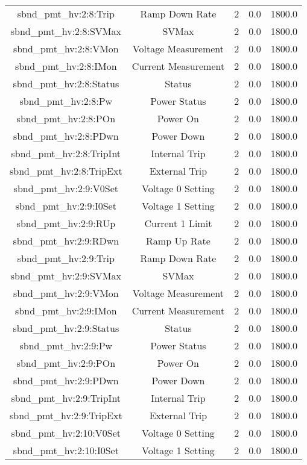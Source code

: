 \begin{center}
\begin{longtable}{c | c c c c }
sbnd\_pmt\_hv:2:8:Trip & Ramp Down Rate & 2 & 0.0 & 1800.0\\ 
sbnd\_pmt\_hv:2:8:SVMax & SVMax & 2 & 0.0 & 1800.0\\ 
sbnd\_pmt\_hv:2:8:VMon & Voltage Measurement & 2 & 0.0 & 1800.0\\ 
sbnd\_pmt\_hv:2:8:IMon & Current Measurement & 2 & 0.0 & 1800.0\\ 
sbnd\_pmt\_hv:2:8:Status & Status & 2 & 0.0 & 1800.0\\ 
sbnd\_pmt\_hv:2:8:Pw & Power Status & 2 & 0.0 & 1800.0\\ 
sbnd\_pmt\_hv:2:8:POn & Power On & 2 & 0.0 & 1800.0\\ 
sbnd\_pmt\_hv:2:8:PDwn & Power Down & 2 & 0.0 & 1800.0\\ 
sbnd\_pmt\_hv:2:8:TripInt & Internal Trip & 2 & 0.0 & 1800.0\\ 
sbnd\_pmt\_hv:2:8:TripExt & External Trip & 2 & 0.0 & 1800.0\\ 
sbnd\_pmt\_hv:2:9:V0Set & Voltage 0 Setting & 2 & 0.0 & 1800.0\\ 
sbnd\_pmt\_hv:2:9:I0Set & Voltage 1 Setting & 2 & 0.0 & 1800.0\\ 
sbnd\_pmt\_hv:2:9:RUp & Current 1 Limit & 2 & 0.0 & 1800.0\\ 
sbnd\_pmt\_hv:2:9:RDwn & Ramp Up Rate & 2 & 0.0 & 1800.0\\ 
sbnd\_pmt\_hv:2:9:Trip & Ramp Down Rate & 2 & 0.0 & 1800.0\\ 
sbnd\_pmt\_hv:2:9:SVMax & SVMax & 2 & 0.0 & 1800.0\\ 
sbnd\_pmt\_hv:2:9:VMon & Voltage Measurement & 2 & 0.0 & 1800.0\\ 
sbnd\_pmt\_hv:2:9:IMon & Current Measurement & 2 & 0.0 & 1800.0\\ 
sbnd\_pmt\_hv:2:9:Status & Status & 2 & 0.0 & 1800.0\\ 
sbnd\_pmt\_hv:2:9:Pw & Power Status & 2 & 0.0 & 1800.0\\ 
sbnd\_pmt\_hv:2:9:POn & Power On & 2 & 0.0 & 1800.0\\ 
sbnd\_pmt\_hv:2:9:PDwn & Power Down & 2 & 0.0 & 1800.0\\ 
sbnd\_pmt\_hv:2:9:TripInt & Internal Trip & 2 & 0.0 & 1800.0\\ 
sbnd\_pmt\_hv:2:9:TripExt & External Trip & 2 & 0.0 & 1800.0\\ 
sbnd\_pmt\_hv:2:10:V0Set & Voltage 0 Setting & 2 & 0.0 & 1800.0\\ 
sbnd\_pmt\_hv:2:10:I0Set & Voltage 1 Setting & 2 & 0.0 & 1800.0\\ 

\end{longtable}
\end{center}
